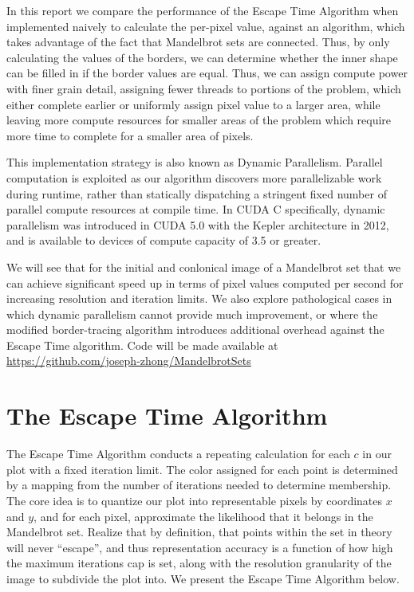 \documentclass[letterpaper]{article}
\begin{document}
\begin{multicols}{2}
In this report we compare the performance of the Escape Time Algorithm when 
  implemented naively to calculate the per-pixel value, against an algorithm,
  which takes advantage of the fact that Mandelbrot sets are connected. Thus, by
  only calculating the values of the borders, we can determine whether the inner
  shape can be filled in if the border values are equal. Thus, we can assign
  compute power with finer grain detail, assigning fewer threads to portions of
  the problem, which either complete earlier or uniformly assign pixel value to
  a larger area, while leaving more compute resources for smaller areas of the
  problem which require more time to complete for a smaller area of pixels.

This implementation strategy is also known as Dynamic Parallelism. Parallel
  computation is exploited as our algorithm discovers more parallelizable work
  during runtime, rather than statically dispatching a stringent fixed number of
  parallel compute resources at compile time. In CUDA C specifically, dynamic
  parallelism was introduced in CUDA 5.0 with the Kepler architecture in 2012,
  and is available to devices of compute capacity of 3.5 or greater. 

We will see that for the initial and conlonical image of a Mandelbrot set that
  we can achieve significant speed up in terms of pixel values computed per 
  second for increasing resolution and iteration limits. We also explore 
  pathological cases in which dynamic parallelism cannot provide much
  improvement, or where the modified border-tracing algorithm introduces
  additional overhead against the Escape Time algorithm. Code will be made
  available at \url{https://github.com/joseph-zhong/MandelbrotSets}

  \section{The Escape Time Algorithm}

The Escape Time Algorithm conducts a repeating calculation for each $c$ in our
  plot with a fixed iteration limit. The color assigned for each point is
  determined by a mapping from the number of iterations needed to determine
  membership. The core idea is to quantize our plot into representable pixels
  by coordinates $x$ and $y$, and for each pixel, approximate the likelihood
  that it belongs in the Mandelbrot set. Realize that by definition, that points
  within the set in theory will never ``escape'',  and thus representation
  accuracy is a function of how high the maximum iterations cap is set, along
  with the resolution granularity of the image to subdivide the plot into.
We present the Escape Time Algorithm below.


\end{multicols}
\end{document}
